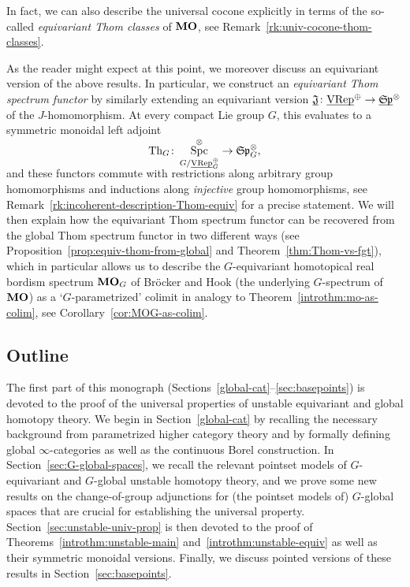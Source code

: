 \documentclass[reqno]{memo-l}
\theoremstyle{mythm}
\theoremstyle{definition}
\numberwithin{equation}{section}
\DeclareMathOperator{\Spc}{Spc}
\newcommand{\cat}[1]{\textbf{\textup{#1}}}
\newcommand{\ulhelper}[2]{\underline{\setbox0=\hbox{$#1#2$}\dp0=0.4pt \box0\relax}}
\newcommand{\ul}[1]{{\mathpalette\ulhelper{#1}}\hbox{\rule[-2pt]{0pt}{0pt}}}
\newcommand{\mySp}{{\mathfrak S\kern-.5pt\mathfrak p}}
\newcommand{\Th}{{\textup{Th}}}
\newcommand{\VRep}{\textup{VRep}}
\begin{document}
In fact, we can also describe the universal cocone explicitly in terms of the so-called \emph{equivariant Thom classes} of $\cat{MO}$, see Remark~\ref{rk:univ-cocone-thom-classes}.

As the reader might expect at this point, we moreover discuss an equivariant version of the above results. In particular, we construct an \emph{equivariant Thom spectrum functor}  by similarly extending an equivariant version $\ul{\mathfrak J}\colon\ul\VRep^\oplus\to\ul\mySp^\otimes$ of the $J$-homomorphism. 
At every compact Lie group $G$, this evaluates to a symmetric monoidal left adjoint 
\[  \smash{\Th_{G}\colon\Spc_{G/\ul\VRep_G^\oplus}^\otimes}\to\mySp_G^\otimes,\] and these functors commute with restrictions along arbitrary group homomorphisms and inductions along \emph{injective} group homomorphisms, see Remark~\ref{rk:incoherent-description-Thom-equiv} for a precise statement. 
We will then explain how the equivariant Thom spectrum functor can be recovered from the global Thom spectrum functor in two different ways (see Proposition~\ref{prop:equiv-thom-from-global} and Theorem~\ref{thm:Thom-vs-fgt}), which in particular allows us to describe the $G$-equivariant homotopical real bordism spectrum $\cat{MO}_G$ of Bröcker and Hook (the underlying $G$-spectrum of $\cat{MO}$) as a `$G$-parametrized' colimit in analogy to Theorem~\ref{introthm:mo-as-colim}, see Corollary~\ref{cor:MOG-as-colim}. 

\subsection*{Outline} The first part of this monograph (Sections~\ref{global-cat}--\ref{sec:basepoints}) is devoted to the proof of the universal properties of unstable equivariant and global homotopy theory. We begin in Section~\ref{global-cat} by recalling the necessary background from parametrized higher category theory and by formally defining global $\infty$-categories as well as the continuous Borel construction. In Section~\ref{sec:G-global-spaces}, we recall the relevant pointset models of $G$-equivariant and $G$-global unstable homotopy theory, and we prove some new results on the change-of-group adjunctions for (the pointset models of) $G$-global spaces that are crucial for establishing the universal property. Section~\ref{sec:unstable-univ-prop} is then devoted to the proof of Theorems~\ref{introthm:unstable-main} and~\ref{introthm:unstable-equiv} as well as their symmetric monoidal versions. Finally, we discuss pointed versions of these results in Section~\ref{sec:basepoints}.
\end{document}
